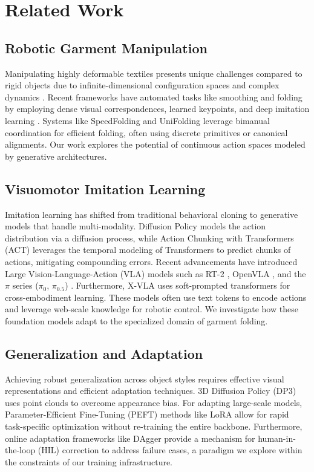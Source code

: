 \section{Related Work}
\label{sec:related}

\subsection{Robotic Garment Manipulation}
Manipulating highly deformable textiles presents unique challenges compared to rigid objects due to infinite-dimensional configuration spaces and complex dynamics \cite{longhini2024unfolding, 8957044}. Recent frameworks have automated tasks like smoothing and folding by employing dense visual correspondences, learned keypoints, and deep imitation learning \cite{ganapathi2020learningdensevisualcorrespondences, grannen2020untanglingdenseknotslearning}. Systems like SpeedFolding \cite{avigal2022speedfolding} and UniFolding \cite{unifolding2023} leverage bimanual coordination for efficient folding, often using discrete primitives or canonical alignments. Our work explores the potential of continuous action spaces modeled by generative architectures.

\subsection{Visuomotor Imitation Learning}
Imitation learning has shifted from traditional behavioral cloning to generative models that handle multi-modality. Diffusion Policy \cite{chi2023diffusionpolicy} models the action distribution via a diffusion process, while Action Chunking with Transformers (ACT) \cite{zhao2023act} leverages the temporal modeling of Transformers to predict chunks of actions, mitigating compounding errors. Recent advancements have introduced Large Vision-Language-Action (VLA) models such as RT-2 \cite{brohan2023rt2visionlanguageactionmodelstransfer}, OpenVLA \cite{kim2024openvlaopensourcevisionlanguageactionmodel}, and the $\pi$ series ($\pi_0$, $\pi_{0.5}$) \cite{black2026pi0visionlanguageactionflowmodel, pi05_2026}. Furthermore, X-VLA \cite{zheng2025xvlasoftpromptedtransformerscalable} uses soft-prompted transformers for cross-embodiment learning. These models often use text tokens to encode actions and leverage web-scale knowledge for robotic control. We investigate how these foundation models adapt to the specialized domain of garment folding.

\subsection{Generalization and Adaptation}
Achieving robust generalization across object styles requires effective visual representations and efficient adaptation techniques. 3D Diffusion Policy (DP3) \cite{ze2024dp3} uses point clouds to overcome appearance bias. For adapting large-scale models, Parameter-Efficient Fine-Tuning (PEFT) methods like LoRA \cite{hu2021lora} allow for rapid task-specific optimization without re-training the entire backbone. Furthermore, online adaptation frameworks like DAgger \cite{ross2011dagger} provide a mechanism for human-in-the-loop (HIL) correction to address failure cases, a paradigm we explore within the constraints of our training infrastructure.
